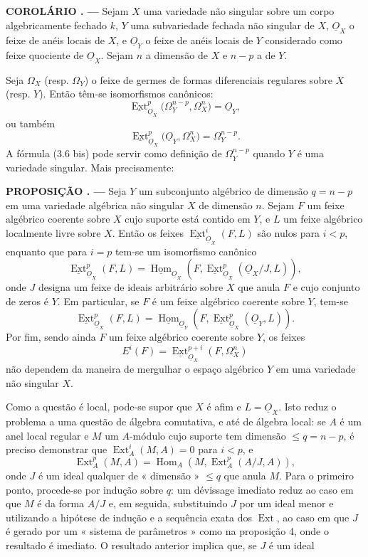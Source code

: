 \documentclass[11pt,twoside,openany]{book}
\numberwithin{equation}{section}
\newcommand{\src}[1]{%
  \phantomsection\hypertarget{src:#1}{}%
  \marginpar{\raggedleft\footnotesize\sffamily #1}%
}
\newcommand{\Osh}{\underline{O}}
\newcommand{\Homsh}{\underline{\operatorname{Hom}}}
\newcommand{\Extsh}{\underline{\operatorname{Ext}}}
\theoremstyle{plain}
\theoremstyle{definition}
\theoremstyle{remark}
\newcommand{\result}[2]{%
  \par\medskip\noindent\textbf{#1%
  \if\relax\detokenize{#2}\relax\else\space#2\fi. ---}\enspace
}
\newcommand{\FgaUnitKey}{frontmatter}
\renewcommand{\src}[1]{%
  \phantomsection\hypertarget{src:\FgaUnitKey:#1}{}%
  \marginpar{\raggedleft\footnotesize\sffamily #1}%
}
\begin{document}
\result{COROLÁRIO}{2} Sejam $X$ uma variedade não singular sobre um corpo
algebricamente fechado $k$, $Y$ uma subvariedade fechada não singular de $X$,
$\Osh_X$ o feixe de anéis locais de $X$, e $\Osh_Y$ o feixe de anéis
locais de $Y$ considerado como feixe quociente de $\Osh_X$. Sejam $n$ a
dimensão de $X$ e $n-p$ a de $Y$.

\src{176}
Seja $\Omega_X$ (resp. $\Omega_Y$) o feixe de germes de formas
diferenciais regulares sobre $X$ (resp. $Y$). Então têm-se isomorfismos
canônicos:
\begin{equation}\tag{3.6}
  \Extsh_{\Osh_X}^{p}\bigl(\Omega_Y^{n-p},\Omega_X^{n}\bigr)=\Osh_Y,
\end{equation}
ou também
\begin{equation}\tag{3.6 bis}
  \Extsh_{\Osh_X}^{p}\bigl(\Osh_Y,\Omega_X^{n}\bigr)=\Omega_Y^{n-p}.
\end{equation}
A fórmula (3.6 bis) pode servir como definição de $\Omega_Y^{n-p}$ quando $Y$
é uma variedade singular. Mais precisamente:

\result{PROPOSIÇÃO}{5} Seja $Y$ um subconjunto algébrico de dimensão
$q=n-p$ em uma variedade algébrica não singular $X$ de dimensão $n$. Sejam
$F$ um feixe algébrico coerente sobre $X$ cujo suporte está contido em $Y$, e $L$
um feixe algébrico localmente livre sobre $X$. Então os feixes
$\Extsh_{\Osh_X}^{i}(F,L)$ são nulos para $i<p$, enquanto que para $i=p$ tem-se um
isomorfismo canônico
\begin{equation}\tag{3.7}
  \Extsh_{\Osh_X}^{p}(F,L)
  =\Homsh_{\Osh_X}\!\left(F,
  \Extsh_{\Osh_X}^{p}(\Osh_X/J,L)\right),
\end{equation}
onde $J$ designa um feixe de ideais arbitrário sobre $X$ que anula $F$ e cujo
conjunto de zeros é $Y$. Em particular, se $F$ é um feixe algébrico
coerente sobre $Y$, tem-se
\begin{equation}\tag{3.7 bis}
  \Extsh_{\Osh_X}^{p}(F,L)
  =\Homsh_{\Osh_Y}\!\left(F,\Extsh_{\Osh_X}^{p}(\Osh_Y,L)\right).
\end{equation}
Por fim, sendo ainda $F$ um feixe algébrico coerente sobre $Y$, os feixes
\[
  E^{i}(F)=\Extsh_{\Osh_X}^{p+i}(F,\Omega_X^{n})
\]
não dependem da maneira de mergulhar o espaço algébrico $Y$ em uma variedade
não singular $X$.

Como a questão é local, pode-se supor que $X$ é afim e $L=\Osh_X$. Isto reduz
o problema a uma questão de álgebra comutativa, e até de álgebra local: se $A$ é um
anel local regular e $M$ um $A$-módulo cujo suporte tem dimensão
$\leq q=n-p$, é preciso demonstrar que $\operatorname{Ext}_{A}^{i}(M,A)=0$ para $i<p$, e
\[
  \operatorname{Ext}_{A}^{p}(M,A)
  =\operatorname{Hom}_{A}\!\left(M,\operatorname{Ext}_{A}^{p}(A/J,A)\right),
\]
onde $J$ é um ideal qualquer de « dimensão » $\leq q$ que anula $M$. Para o
primeiro ponto, procede-se por indução sobre $q$: um dévissage imediato reduz
ao caso em que $M$ é da forma $A/J$ e, em seguida, substituindo $J$ por um ideal menor
e utilizando a hipótese de indução e a sequência exata dos
$\operatorname{Ext}$, ao caso em que $J$ é gerado por um « sistema de parâmetros »
como na proposição 4, onde o resultado é imediato. O resultado
anterior implica que, se $J$ é um ideal
\end{document}

